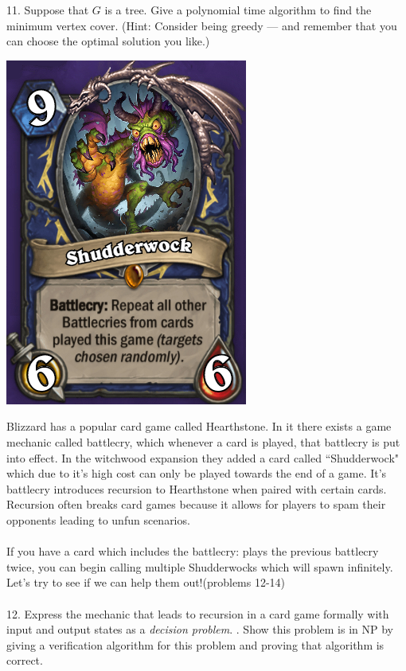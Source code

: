 \documentclass[12pt]{article}
\begin{document}
11. Suppose that $G$ is a tree. Give a polynomial time algorithm to find the
minimum vertex cover. (Hint: Consider being greedy — and remember that you
can choose the optimal solution you like.)
\newpage
\noindent \centerline{\includegraphics[scale = 2]{shudderwock.jpg}}
Blizzard has a popular card game called Hearthstone. In it 
there exists a game mechanic called battlecry, which whenever a card is played,
 that battlecry is put into effect. In the witchwood expansion they added a card called
 ``Shudderwock" which due to it's high cost can only be played towards the end of a game. It's battlecry 
 introduces recursion to Hearthstone when paired with certain cards. Recursion often breaks card games because it 
 allows for players to spam their opponents leading to unfun scenarios.\\\\
 If you have a card which includes the battlecry: plays the previous battlecry twice, you can begin 
 calling multiple Shudderwocks which will spawn infinitely. Let's try to see if we can help them out!(problems 12-14)\\\\
12. Express the mechanic that leads to recursion in a card game formally with input and output states as a \textit{decision problem}.
\newpage
{}. Show this problem is in NP by giving a verification algorithm for this problem and proving that algorithm is correct. \\\\\\\\\\\\\\\\\\\\\\\\\\\\\\\\
\end{document}
